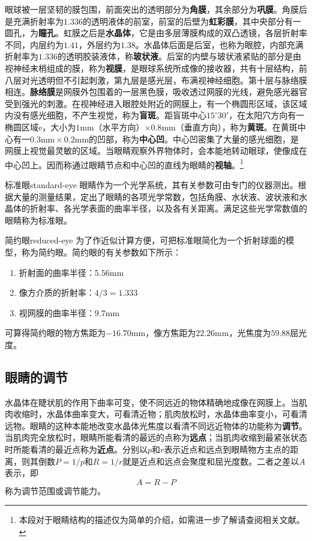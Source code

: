 \documentclass[cn,10pt,chinesefont=founder,math=mtpro2,cite=super,toc=onecol,twoside,openany]{elegantbook}
\begin{document}
眼球被一层坚韧的膜包围，前面突出的透明部分为\textbf{角膜}，其余部分为\textbf{巩膜}。角膜后是充满折射率为$1.336$的透明液体的前室，前室的后壁为\textbf{虹彩膜}，其中央部分有一圆孔，为\textbf{瞳孔}。虹膜之后是\textbf{水晶体}，它是由多层薄膜构成的双凸透镜，各层折射率不同，内层约为$1.41$，外层约为$1.38$。水晶体后面是后室，也称为眼腔，内部充满折射率为$1.336$的透明胶装液体，称\textbf{玻状液}。后室的内壁与玻状液紧贴的部分是由视神经末梢组成的膜，称为\textbf{视膜}，是眼球系统所成像的接收器，共有十层结构，前八层对光透明但不引起刺激，第九层是感光层，布满视神经细胞。第十层与脉络膜相连。\textbf{脉络膜}是网膜外包围着的一层黑色膜，吸收透过网膜的光线，避免感光器官受到强光的刺激。在视神经进入眼腔处附近的网膜上，有一个椭圆形区域，该区域内没有感光细胞，不产生视觉，称为\textbf{盲斑}。距盲斑中心$15^{\circ}30'$，在太阳穴方向有一椭圆区域e，大小为$1\mathrm{mm}$（水平方向）$\times0.8\mathrm{mm}$（垂直方向），称为\textbf{黄斑}。在黄斑中心有一$0.3\mathrm{mm}\times0.2\mathrm{mm}$的凹部，称为\textbf{中心凹}。中心凹密集了大量的感光细胞，是网膜上视觉最灵敏的区域。当眼睛观察外界物体时，会本能地转动眼球，使像成在中心凹上。因而称通过眼睛节点和中心凹的直线为眼睛的\textbf{视轴}。\footnote{本段对于眼睛结构的描述仅为简单的介绍，如需进一步了解请查阅相关文献。}

\begin{definition}{标准眼}{standard-eye}
	眼睛作为一个光学系统，其有关参数可由专门的仪器测出。根据大量的测量结果，定出了眼睛的各项光学常数，包括角膜、水状液、波状液和水晶体的折射率、各光学表面的曲率半径，以及各有关距离。满足这些光学常数值的眼睛称为标准眼。
\end{definition}

\begin{definition}{简约眼}{reduced-eye}
	为了作近似计算方便，可把标准眼简化为一个折射球面的模型，称为简约眼。简约眼的有关参数如下所示：
	\begin{enumerate}
		\item 折射面的曲率半径：$5.56\mathrm{mm}$
		\item 像方介质的折射率：$4/3=1.333$
		\item 视网膜的曲率半径：$9.7\mathrm{mm}$
	\end{enumerate}
	可算得简约眼的物方焦距为$-16.70\mathrm{mm}$，像方焦距为$22.26\mathrm{mm}$，光焦度为$59.88$屈光度。
\end{definition}

\subsection{眼睛的调节}
水晶体在睫状肌的作用下曲率可变，使不同远近的物体精确地成像在网膜上。当肌肉收缩时，水晶体曲率变大，可看清近物；肌肉放松时，水晶体曲率变小，可看清远物。眼睛的这种本能地改变水晶体光焦度以看清不同远近物体的功能称为\textbf{调节}。当肌肉完全放松时，眼睛所能看清的最远的点称为\textbf{远点}；当肌肉收缩到最紧张状态时所能看清的最近点称为\textbf{近点}。分别以$p$和$r$表示近点和远点到眼睛物方主点的距离，则其倒数$P=1/p$和$R=1/r$就是近点和远点会聚度和屈光度数。二者之差以$A$表示，即
\begin{equation}
A=R-P
\end{equation}
称为调节范围或调节能力。
\end{document}
